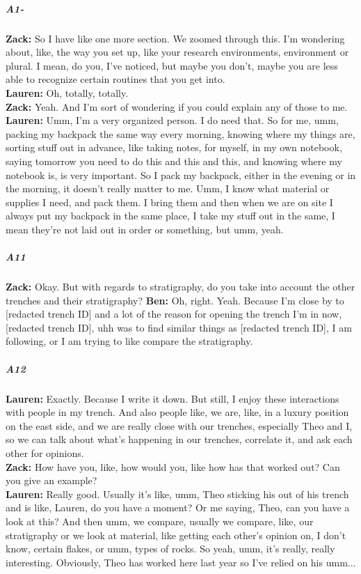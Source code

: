 \documentclass[
]{article}
\begin{document}
\subparagraph{A1-}\label{sec-A10}

\textbf{Zack:} So I have like one more section. We zoomed through this.
I'm wondering about, like, the way you set up, like your research
environments, environment or plural. I mean, do you, I've noticed, but
maybe you don't, maybe you are less able to recognize certain routines
that you get into.\\
\textbf{Lauren:} Oh, totally, totally.\\
\textbf{Zack:} Yeah. And I'm sort of wondering if you could explain any
of those to me.\\
\textbf{Lauren:} Umm, I'm a very organized person. I do need that. So
for me, umm, packing my backpack the same way every morning, knowing
where my things are, sorting stuff out in advance, like taking notes,
for myself, in my own notebook, saying tomorrow you need to do this and
this and this, and knowing where my notebook is, is very important. So I
pack my backpack, either in the evening or in the morning, it doesn't
really matter to me. Umm, I know what material or supplies I need, and
pack them. I bring them and then when we are on site I always put my
backpack in the same place, I take my stuff out in the same, I mean
they're not laid out in order or something, but umm, yeah.

\subparagraph{A11}\label{sec-A11}

\textbf{Zack:} Okay. But with regards to stratigraphy, do you take into
account the other trenches and their stratigraphy? \textbf{Ben:} Oh,
right. Yeah. Because I'm close by to {[}redacted trench ID{]} and a lot
of the reason for opening the trench I'm in now, {[}redacted trench
ID{]}, uhh was to find similar things as {[}redacted trench ID{]}, I am
following, or I am trying to like compare the stratigraphy.

\subparagraph{A12}\label{sec-A12}

\textbf{Lauren:} Exactly. Because I write it down. But still, I enjoy
these interactions with people in my trench. And also people like, we
are, like, in a luxury position on the east side, and we are really
close with our trenches, especially Theo and I, so we can talk about
what's happening in our trenches, correlate it, and ask each other for
opinions.\\
\textbf{Zack:} How have you, like, how would you, like how has that
worked out? Can you give an example?\\
\textbf{Lauren:} Really good. Usually it's like, umm, Theo sticking his
out of his trench and is like, Lauren, do you have a moment? Or me
saying, Theo, can you have a look at this? And then umm, we compare,
usually we compare, like, our stratigraphy or we look at material, like
getting each other's opinion on, I don't know, certain flakes, or umm,
types of rocks. So yeah, umm, it's really, really interesting.
Obviously, Theo has worked here last year so I've relied on his umm...
\end{document}
